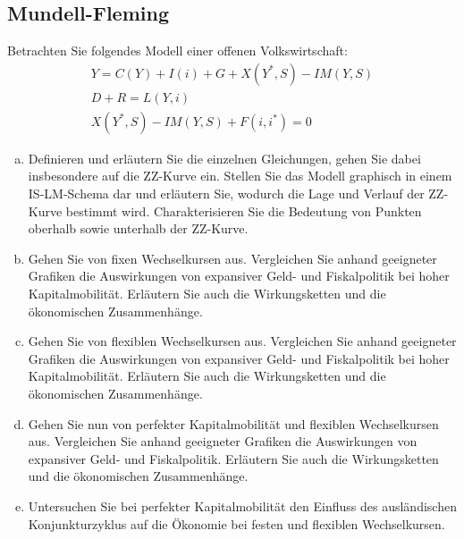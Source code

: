 \documentclass{scrartcl}
\begin{document}
\subsection{Mundell-Fleming}
Betrachten Sie folgendes Modell einer offenen Volkswirtschaft:
\begin{align}
  Y = C(Y)+I(i)+G+X(Y^*,S)-IM(Y,S)\\
  D + R = L(Y,i)\\
  X(Y^*,S)-IM(Y,S)+F(i,i^*)=0
\end{align}
\begin{enumerate}[(a)]
  \item Definieren und erl\"{a}utern Sie die einzelnen Gleichungen, gehen Sie dabei insbesondere auf die ZZ-Kurve ein. Stellen Sie das Modell graphisch in einem IS-LM-Schema dar und erl\"{a}utern Sie, wodurch die Lage und Verlauf der ZZ-Kurve bestimmt wird. Charakterisieren Sie die Bedeutung von Punkten oberhalb sowie unterhalb der ZZ-Kurve.
  \item Gehen Sie von fixen Wechselkursen aus. Vergleichen Sie anhand geeigneter Grafiken die Auswirkungen von expansiver Geld- und Fiskalpolitik bei hoher Kapitalmobilit\"{a}t. Erl\"{a}utern Sie auch die Wirkungsketten und die \"{o}konomischen Zusammenh\"{a}nge.
  \item Gehen Sie von flexiblen Wechselkursen aus. Vergleichen Sie anhand geeigneter Grafiken die Auswirkungen von expansiver Geld- und Fiskalpolitik bei hoher Kapitalmobilit\"{a}t. Erl\"{a}utern Sie auch die Wirkungsketten und die \"{o}konomischen Zusammenh\"{a}nge.
  \item Gehen Sie nun von perfekter Kapitalmobilit\"{a}t und flexiblen Wechselkursen aus. Vergleichen Sie anhand geeigneter Grafiken die Auswirkungen von expansiver Geld- und Fiskalpolitik. Erl\"{a}utern Sie auch die Wirkungsketten und die \"{o}konomischen Zusammenh\"{a}nge.
  \item Untersuchen Sie bei perfekter Kapitalmobilit\"{a}t den Einfluss des ausl\"{a}ndischen Konjunkturzyklus auf die \"{O}konomie bei festen und flexiblen Wechselkursen.
\end{enumerate}
\end{document}

